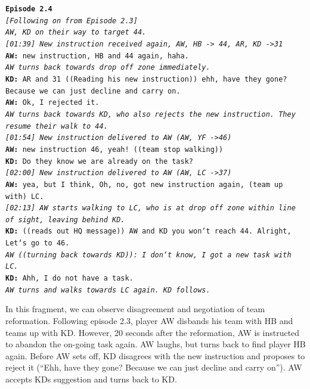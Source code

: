 \noindent\texttt{\textbf{Episode 2.4}\\
\emph{[Following on from Episode 2.3]}\\
\emph{AW, KD on their way to target 44.}\\
\emph{[01:39] New instruction received again, AW, HB -> 44, AR, KD ->31}\\
\textbf{AW:} new instruction, HB and 44 again, haha.\\
\emph{AW turns back towards drop off zone immediately.}\\
\textbf{KD:} AR and 31 ((Reading his new instruction)) ehh, have they gone? Because we can just decline and carry on.\\
\textbf{AW:} Ok, I rejected it. \\
\emph{AW turns back towards KD, who also rejects the new instruction. They resume their walk to 44.}\\
\emph{[01:54] New instruction delivered to AW (AW, YF ->46)}\\
\textbf{AW:} new instruction 46, yeah! ((team stop walking))\\
\textbf{KD:} Do they know we are already on the task?\\
\emph{[02:00] New instruction delivered to AW (AW, LC ->37)}\\
\textbf{AW:} yea, but I think, Oh, no, got new instruction again, (team up with) LC.\\
\emph{[02:13] AW starts walking to LC, who is at drop off zone within line of sight, leaving behind KD.}\\
\textbf{KD:} ((reads out HQ message)) AW and KD you won`t reach 44.  Alright, Let`s go to 46.\\
\emph{AW ((turning back towards KD)): I don`t know, I got a new task with LC.}\\
\textbf{KD:} Ahh, I do not have a task. \\
\emph{AW turns and walks towards LC again. KD follows.}\\
}


In this fragment, we can observe disagreement and negotiation of team reformation. Following episode 2.3, player AW disbands his team with HB and teams up with KD. However, 20 seconds after the reformation, AW is instructed to abandon the on-going task again. AW laughs, but turns back to find player HB again. Before AW sets off, KD disagrees with the new instruction and proposes to reject it (``Ehh, have they gone? Because we can just decline and carry on''). AW accepts KDs suggestion and turns back to KD.\\

